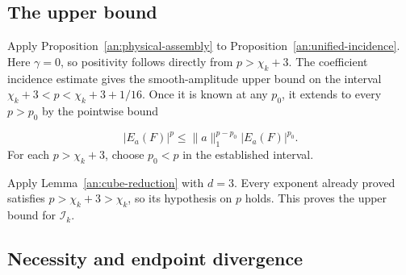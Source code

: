 \documentclass[11pt]{amsart}
\theoremstyle{definition}
\theoremstyle{remark}
\numberwithin{equation}{section}
\begin{document}
\subsection{The upper bound}\label{completion:upper-bound}

Apply Proposition~\ref{an:physical-assembly} to Proposition~\ref{an:unified-incidence}. Here $\gamma=0$, so positivity follows directly from $p>\chi_k+3$. The coefficient incidence estimate gives the smooth-amplitude upper bound on the interval $\chi_k+3<p<\chi_k+3+1/16$. Once it is known at any $p_0$, it extends to every $p>p_0$ by the pointwise bound

\begin{equation}\label{an:larger-p}
|E_a(F)|^p\le\|a\|_1^{p-p_0}|E_a(F)|^{p_0}.
\end{equation}
For each $p>\chi_k+3$, choose $p_0<p$ in the established interval.


Apply Lemma~\ref{an:cube-reduction} with $d=3$. Every exponent already proved satisfies $p>\chi_k+3>\chi_k$, so its hypothesis on $p$ holds. This proves the upper bound for $\mathcal I_k$.

\subsection{Necessity and endpoint divergence}\label{completion:sharpness}\label{an:sharpness-subsection}
\end{document}

